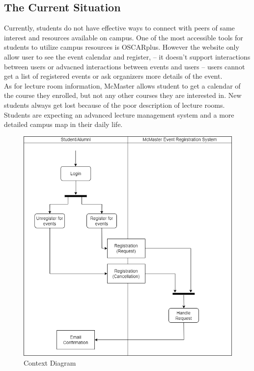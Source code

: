 \documentclass[12pt]{article}
\begin{document}
\subsection{The Current Situation}
Currently, students do not have effective ways to connect with peers of same interest and resources available on campus.  One of the most accessible tools for students to utilize campus resources is OSCARplus. However the website only allow user to see the event calendar and register, -- it doesn't support interactions between users or advacned interactions between events and users -- users cannot get a list of registered events or ask organizers more details of the event.\\
As for lecture room information,  McMaster allows student to get a calendar of the course they enrolled, but not any other courses they are interested in. New students always get lost because of the poor description of lecture rooms.  Students are expecting an advanced lecture management system and a more detailed campus map in their daily life.
\begin{figure}[H]
\begin{center}
\includegraphics[scale=0.5]{Current_Situation.png}
\end{center}
\caption{Context Diagram}
\end{figure}
\end{document}
